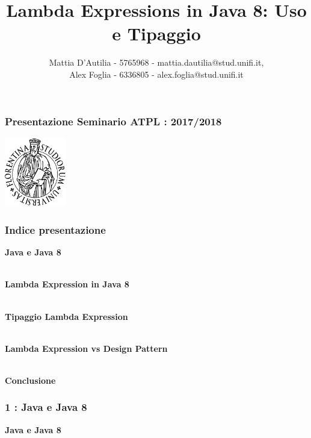 \documentclass{beamer}
\title[Seminario ATPL 17/18]{Lambda Expressions in Java 8: Uso e Tipaggio}
\author[]{Mattia D'Autilia - 5765968 - mattia.dautilia@stud.unifi.it,\\ Alex Foglia - 6336805 - alex.foglia@stud.unifi.it}
\date{}
\begin{document}

\begin{frame}
	\frametitle{\textbf{Presentazione Seminario ATPL : 2017/2018}}
	\begin{center}
  		\includegraphics[width=0.2\textwidth]{assets/logo-unifi.png}
  	\end{center}
	\titlepage 
\end{frame}


\begin{frame}
	\frametitle{\textbf{Indice presentazione}}
	\begin{enumerate}
	\end{enumerate}
\end{frame}


\begin{frame}
	\frametitle{\textbf{1 : Java e Java 8}}
	\begin{center}
		\textbf{\Huge Java e Java 8}
	\end{center}
\end{frame}

\end{document}
